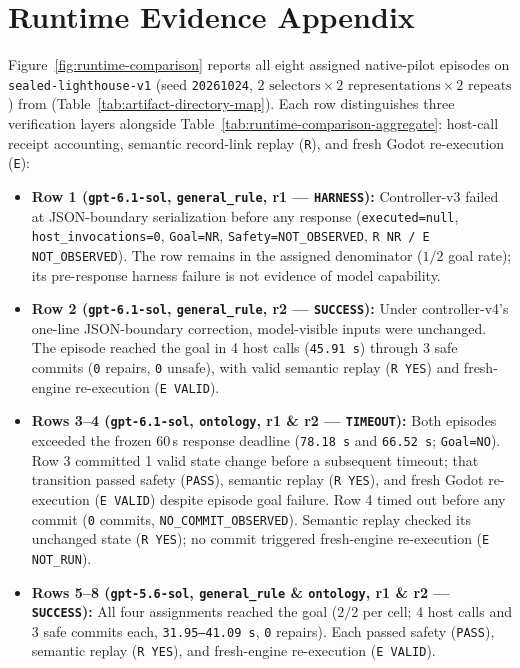\documentclass[journal]{IEEEtran}
\begin{document}
\section{Runtime Evidence Appendix}\label{app:runtime-evidence}
Figure~\ref{fig:runtime-comparison} reports all eight assigned native-pilot episodes on \texttt{sealed-lighthouse-v1} (seed \texttt{20261024}, $2\text{ selectors}\times 2\text{ representations}\times 2\text{ repeats}$) from  (Table~\ref{tab:artifact-directory-map}). Each row distinguishes three verification layers alongside Table~\ref{tab:runtime-comparison-aggregate}: host-call receipt accounting, semantic record-link replay (\texttt{R}), and fresh Godot re-execution (\texttt{E}):
\begin{itemize}
  \item \textbf{Row 1 (\texttt{gpt-6.1-sol}, \texttt{general\_rule}, r1 --- \texttt{HARNESS}):} Controller-v3 failed at JSON-boundary serialization before any response (\texttt{executed=null}, \texttt{host\_invocations=0}, \texttt{Goal=NR}, \texttt{Safety=NOT\_OBSERVED}, \texttt{R NR / E NOT\_OBSERVED}). The row remains in the assigned denominator ($1/2$ goal rate); its pre-response harness failure is not evidence of model capability.
  \item \textbf{Row 2 (\texttt{gpt-6.1-sol}, \texttt{general\_rule}, r2 --- \texttt{SUCCESS}):} Under controller-v4's one-line JSON-boundary correction, model-visible inputs were unchanged. The episode reached the goal in 4 host calls (\texttt{45.91\,s}) through 3 safe commits (\texttt{0} repairs, \texttt{0} unsafe), with valid semantic replay (\texttt{R YES}) and fresh-engine re-execution (\texttt{E VALID}).
  \item \textbf{Rows 3--4 (\texttt{gpt-6.1-sol}, \texttt{ontology}, r1 \& r2 --- \texttt{TIMEOUT}):} Both episodes exceeded the frozen 60\,s response deadline (\texttt{78.18\,s} and \texttt{66.52\,s}; \texttt{Goal=NO}). Row 3 committed 1 valid state change before a subsequent timeout; that transition passed safety (\texttt{PASS}), semantic replay (\texttt{R YES}), and fresh Godot re-execution (\texttt{E VALID}) despite episode goal failure. Row 4 timed out before any commit (\texttt{0} commits, \texttt{NO\_COMMIT\_OBSERVED}). Semantic replay checked its unchanged state (\texttt{R YES}); no commit triggered fresh-engine re-execution (\texttt{E NOT\_RUN}).
  \item \textbf{Rows 5--8 (\texttt{gpt-5.6-sol}, \texttt{general\_rule} \& \texttt{ontology}, r1 \& r2 --- \texttt{SUCCESS}):} All four assignments reached the goal ($2/2$ per cell; 4 host calls and 3 safe commits each, \texttt{31.95--41.09\,s}, \texttt{0} repairs). Each passed safety (\texttt{PASS}), semantic replay (\texttt{R YES}), and fresh-engine re-execution (\texttt{E VALID}).
\end{itemize}
\end{document}

